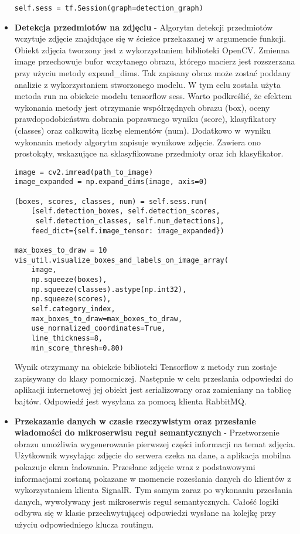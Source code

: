 \begin{itemize}
\begin{lstlisting}[caption={Fragment inicjalizacji obiektów biblioteki Tensorflow.}]
	self.sess = tf.Session(graph=detection_graph)
\end{lstlisting}
\item \textbf{Detekcja przedmiotów na zdjęciu} - Algorytm detekcji przedmiotów wczytuje zdjęcie znajdujące się w ścieżce przekazanej w argumencie funkcji. Obiekt zdjęcia tworzony jest z wykorzystaniem biblioteki OpenCV. Zmienna image przechowuje bufor wczytanego obrazu, którego macierz jest rozszerzana przy użyciu metody expand\_dims. Tak zapisany obraz może zostać poddany analizie z wykorzystaniem stworzonego modelu. W tym celu została użyta metoda run na obiekcie modelu tensorflow sess. Warto podkreślić, że efektem wykonania metody jest otrzymanie współrzędnych obrazu (box), oceny prawdopodobieństwa dobrania poprawnego wyniku (score), klasyfikatory (classes) oraz całkowitą liczbę elementów (num). Dodatkowo w~wyniku wykonania metody algorytm zapisuje wynikowe zdjęcie. Zawiera ono prostokąty, wskazujące na sklasyfikowane przedmioty oraz ich klasyfikator.
\newline

\begin{lstlisting}[caption={Detekcja przedmiotów na obrazie.}]
image = cv2.imread(path_to_image)
image_expanded = np.expand_dims(image, axis=0)

(boxes, scores, classes, num) = self.sess.run(
	[self.detection_boxes, self.detection_scores,
	 self.detection_classes, self.num_detections],
	feed_dict={self.image_tensor: image_expanded})

max_boxes_to_draw = 10
vis_util.visualize_boxes_and_labels_on_image_array(
	image,
	np.squeeze(boxes),
	np.squeeze(classes).astype(np.int32),
	np.squeeze(scores),
	self.category_index,
	max_boxes_to_draw=max_boxes_to_draw,
	use_normalized_coordinates=True,
	line_thickness=8,
	min_score_thresh=0.80)
\end{lstlisting}

Wynik otrzymany na obiekcie biblioteki Tensorflow z metody run zostaje zapisywany do klasy pomocniczej. Następnie w celu przesłania odpowiedzi do aplikacji internetowej jej obiekt jest serializowany oraz zamieniany na tablicę bajtów. Odpowiedź jest wysyłana za pomocą klienta RabbitMQ.
\newline

\item \textbf{Przekazanie danych w czasie rzeczywistym oraz przesłanie wiadomości do mikroserwisu reguł semantycznych} - Przetworzenie obrazu umożliwia wygenerowanie pierwszej części informacji na temat zdjęcia. Użytkownik wysyłając zdjęcie do serwera czeka na dane, a aplikacja mobilna pokazuje ekran ładowania. Przesłane zdjęcie wraz z podstawowymi informacjami zostaną pokazane w momencie rozesłania danych do klientów z wykorzystaniem klienta SignalR. Tym samym zaraz po wykonaniu przesłania danych, wywoływany jest mikroserwis reguł semantycznych. Całość logiki odbywa się w klasie przechwytującej odpowiedzi wysłane na kolejkę przy użyciu odpowiedniego klucza routingu.


\end{itemize}

